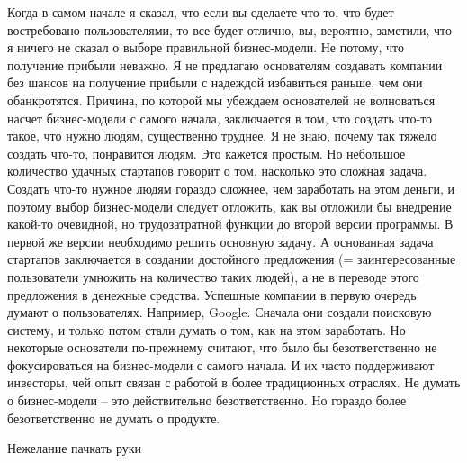 \documentclass[ebook,12pt,oneside,openany]{memoir}
\begin{document}
Когда в самом начале я сказал, что если вы сделаете что-то, что будет
востребовано пользователями, то все будет отлично, вы, вероятно,
заметили, что я ничего не сказал о выборе правильной бизнес-модели. Не
потому, что получение прибыли неважно. Я не предлагаю основателям
создавать компании без шансов на получение прибыли с надеждой
избавиться раньше, чем они обанкротятся. Причина, по которой мы
убеждаем основателей не волноваться насчет бизнес-модели с самого
начала, заключается в том, что создать что-то такое, что нужно людям,
существенно труднее. Я не знаю, почему так тяжело создать что-то,
понравится людям. Это кажется простым. Но небольшое количество удачных
стартапов говорит о том, насколько это сложная задача. Создать что-то
нужное людям гораздо сложнее, чем заработать на этом деньги, и поэтому
выбор бизнес-модели следует отложить, как вы отложили бы внедрение
какой-то очевидной, но трудозатратной функции до второй версии
программы. В первой же версии необходимо решить основную задачу. А
основанная задача стартапов заключается в создании достойного
предложения (= заинтересованные пользователи умножить на количество
таких людей), а не в переводе этого предложения в денежные средства.
Успешные компании в первую очередь думают о пользователях. Например,
Google. Сначала они создали поисковую систему, и только потом стали
думать о том, как на этом заработать. Но некоторые основатели
по-прежнему считают, что было бы безответственно не фокусироваться на
бизнес-модели с самого начала. И их часто поддерживают инвесторы, чей
опыт связан с работой в более традиционных отраслях. Не думать о
бизнес-модели – это действительно безответственно. Но гораздо более
безответственно не думать о продукте.

Нежелание пачкать руки
\end{document}
